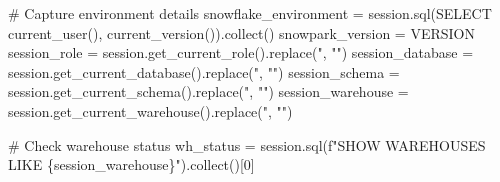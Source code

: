 \documentclass[
  letterpaper,
  DIV=11,
  numbers=noendperiod]{scrreprt}
\newenvironment{Shaded}{\begin{snugshade}}{\end{snugshade}}
\newcommand{\CommentTok}[1]{\textcolor[rgb]{0.37,0.37,0.37}{#1}}
\newcommand{\DecValTok}[1]{\textcolor[rgb]{0.68,0.00,0.00}{#1}}
\newcommand{\NormalTok}[1]{\textcolor[rgb]{0.00,0.23,0.31}{#1}}
\newcommand{\OperatorTok}[1]{\textcolor[rgb]{0.37,0.37,0.37}{#1}}
\newcommand{\SpecialCharTok}[1]{\textcolor[rgb]{0.37,0.37,0.37}{#1}}
\newcommand{\SpecialStringTok}[1]{\textcolor[rgb]{0.13,0.47,0.30}{#1}}
\newcommand{\StringTok}[1]{\textcolor[rgb]{0.13,0.47,0.30}{#1}}
\begin{document}
\begin{Shaded}
\begin{Highlighting}[]
\CommentTok{\# Capture environment details}
\NormalTok{snowflake\_environment }\OperatorTok{=}\NormalTok{ session.sql(}\StringTok{\textquotesingle{}SELECT current\_user(), current\_version()\textquotesingle{}}\NormalTok{).collect()}
\NormalTok{snowpark\_version }\OperatorTok{=}\NormalTok{ VERSION}
\NormalTok{session\_role }\OperatorTok{=}\NormalTok{ session.get\_current\_role().replace(}\StringTok{\textquotesingle{}"\textquotesingle{}}\NormalTok{, }\StringTok{""}\NormalTok{)}
\NormalTok{session\_database }\OperatorTok{=}\NormalTok{ session.get\_current\_database().replace(}\StringTok{\textquotesingle{}"\textquotesingle{}}\NormalTok{, }\StringTok{""}\NormalTok{)}
\NormalTok{session\_schema }\OperatorTok{=}\NormalTok{ session.get\_current\_schema().replace(}\StringTok{\textquotesingle{}"\textquotesingle{}}\NormalTok{, }\StringTok{""}\NormalTok{)}
\NormalTok{session\_warehouse }\OperatorTok{=}\NormalTok{ session.get\_current\_warehouse().replace(}\StringTok{\textquotesingle{}"\textquotesingle{}}\NormalTok{, }\StringTok{""}\NormalTok{)}

\CommentTok{\# Check warehouse status}
\NormalTok{wh\_status }\OperatorTok{=}\NormalTok{ session.sql(}\SpecialStringTok{f"SHOW WAREHOUSES LIKE \textquotesingle{}}\SpecialCharTok{\{}\NormalTok{session\_warehouse}\SpecialCharTok{\}}\SpecialStringTok{\textquotesingle{}"}\NormalTok{).collect()[}\DecValTok{0}\NormalTok{]}


\end{Highlighting}
\end{Shaded}
\end{document}
